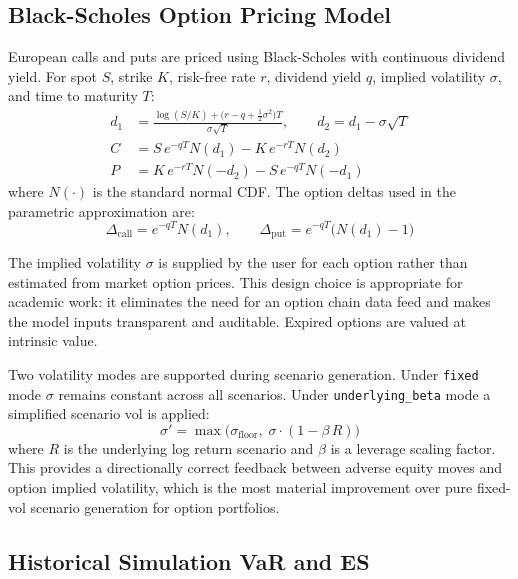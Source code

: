 \documentclass[11pt]{article}
\newcommand{\code}[1]{\texttt{#1}}
\begin{document}
\subsection{Black-Scholes Option Pricing Model}

European calls and puts are priced using Black-Scholes with continuous dividend
yield.  For spot $S$, strike $K$, risk-free rate $r$, dividend yield $q$,
implied volatility $\sigma$, and time to maturity $T$:
\begin{align}
  d_1 &= \frac{\log(S/K) + \bigl(r - q + \tfrac{1}{2}\sigma^2\bigr)T}
              {\sigma\sqrt{T}},
  \qquad d_2 = d_1 - \sigma\sqrt{T}
  \label{eq:bs_d1d2}\\[6pt]
  C   &= S\,e^{-qT} N(d_1) - K\,e^{-rT} N(d_2)
  \label{eq:bs_call}\\[4pt]
  P   &= K\,e^{-rT} N(-d_2) - S\,e^{-qT} N(-d_1)
  \label{eq:bs_put}
\end{align}
where $N(\cdot)$ is the standard normal CDF.  The option deltas used in the
parametric approximation are:
\begin{equation}
  \Delta_{\mathrm{call}} = e^{-qT} N(d_1),
  \qquad
  \Delta_{\mathrm{put}}  = e^{-qT}\bigl(N(d_1) - 1\bigr)
  \label{eq:bs_delta}
\end{equation}

The implied volatility $\sigma$ is supplied by the user for each option rather
than estimated from market option prices.  This design choice is appropriate for
academic work: it eliminates the need for an option chain data feed and makes
the model inputs transparent and auditable.  Expired options are valued at
intrinsic value.

Two volatility modes are supported during scenario generation.  Under
\code{fixed} mode $\sigma$ remains constant across all scenarios.  Under
\code{underlying\_beta} mode a simplified scenario vol is applied:
\begin{equation}
  \sigma'= \max\!\bigl(\sigma_{\mathrm{floor}},\; \sigma \cdot (1 - \beta\, R)\bigr)
  \label{eq:vol_shock}
\end{equation}
where $R$ is the underlying log return scenario and $\beta$ is a leverage
scaling factor.  This provides a directionally correct feedback between adverse
equity moves and option implied volatility, which is the most material
improvement over pure fixed-vol scenario generation for option portfolios.

\subsection{Historical Simulation VaR and ES}
\end{document}
